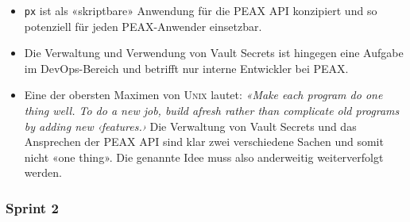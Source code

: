 \begin{itemize}
\begin{itemize}
        \item \texttt{px} ist als «skriptbare» Anwendung für die PEAX API konzipiert und so potenziell für jeden PEAX-Anwender einsetzbar.
        \item Die Verwaltung und Verwendung von Vault Secrets ist hingegen eine Aufgabe im DevOps-Bereich und betrifft nur interne Entwickler bei PEAX.
        \item Eine der obersten Maximen von \textsc{Unix} lautet: \textit{«Make each program do one thing well. To do a new job, build afresh rather than complicate old programs by adding new ‹features.›} \cite[p. 3]{unixtimesharing} Die Verwaltung von Vault Secrets und das Ansprechen der PEAX API sind klar zwei verschiedene Sachen und somit nicht «one thing». Die genannte Idee muss also anderweitig weiterverfolgt werden.
    \end{itemize}
\end{itemize}

\subsubsection{Sprint 2}

